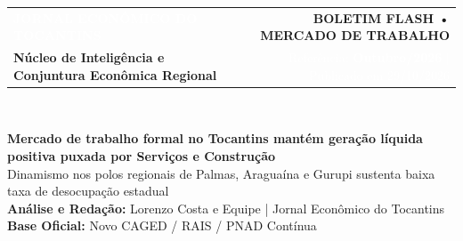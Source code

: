 \documentclass[10pt,a4paper]{article}
\begin{document}
\color{cinzatexto}

\noindent\colorbox{azulto}{%
  \parbox{\dimexpr\textwidth-2\fboxsep\relax}{%
    \vspace{6pt}%
    \begin{tabularx}{\linewidth}{@{}X r@{}}
      {\fontsize{15}{18}\selectfont\textbf{\textcolor{white}{JORNAL ECONÔMICO DO TOCANTINS}}} &
      \colorbox{douradoto}{\textbf{\footnotesize\textcolor{azulto}{\hspace{4pt}BOLETIM FLASH • MERCADO DE TRABALHO\hspace{4pt}}}} \\[4pt]
      {\footnotesize\textcolor{douradoto}{\textbf{Núcleo de Inteligência e Conjuntura Econômica Regional}}} &
      {\footnotesize\textcolor{white}{Referência: \textbf{Outubro/2026} $\vert$ Publicado em 29/10/2026}}
    \end{tabularx}%
    \vspace{4pt}%
  }%
}\\[-2pt]
\noindent{\color{douradoto}\rule{\textwidth}{2.5pt}}

\vspace{6pt}

{\fontsize{16}{20}\selectfont\textbf{\textcolor{azulto}{Mercado de trabalho formal no Tocantins mantém geração líquida positiva puxada por Serviços e Construção}}}\\[4pt]
{\normalsize\textcolor{cinzasuave}{Dinamismo nos polos regionais de Palmas, Araguaína e Gurupi sustenta baixa taxa de desocupação estadual}}\\[4pt]
{\footnotesize\textcolor{azulto}{\textbf{Análise e Redação:}} \textcolor{cinzatexto}{Lorenzo Costa e Equipe | Jornal Econômico do Tocantins} \hfill \textcolor{azulto}{\textbf{Base Oficial:}} \textcolor{cinzatexto}{Novo CAGED / RAIS / PNAD Contínua}}

\vspace{2pt}

\noindent{}
\end{document}
